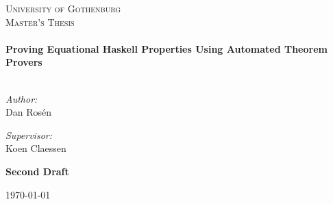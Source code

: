 \begin{titlepage}

\begin{center}


\vspace{4cm}

\textsc{\LARGE University of Gothenburg}\\[1.5cm]

\textsc{\Large Master's Thesis}\\[0.5cm]


\HRule \\[0.4cm]
{ \huge \bfseries Proving Equational Haskell Properties Using Automated Theorem Provers}\\[0.3cm]

\HRule \\[1.5cm]

\begin{minipage}{0.4\textwidth}
\begin{flushleft} \large
\emph{Author:}\\
Dan Rosén
\end{flushleft}
\end{minipage}
\begin{minipage}{0.4\textwidth}
\begin{flushright} \large
\emph{Supervisor:} \\
Koen Claessen
\end{flushright}
\end{minipage}

\vfill

{
\Large \textbf{Second Draft}

\vspace{2cm}

\large \today
}

\end{center}

\end{titlepage}